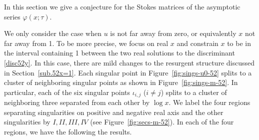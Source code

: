 \documentclass[12pt,reqno]{amsart}
\theoremstyle{definition}
\begin{document}
In this section we give a conjecture for the Stokes matrices of
the asymptotic series $\varphi(x;\tau)$.

We only consider the case when $u$ is not far away from zero, or
equivalently $x$ not far away from 1.  To be more precise, we focus on
real $x$ and constrain $x$ to be in the interval containing 1 between
the two real solutions to the discriminant \eqref{disc52y}.  In this
case, there are mild changes to the resurgent structure discussed in
Section~\ref{sub.52x=1}.  Each singular point in
Figure~\ref{fig:sings-u0-52} splits to a cluster of neighboring
singular points as shown in Figure~\ref{fig:sings-m-52}.  In
particular, each of the six singular points $\iota_{i,j}$ ($i\neq j$)
splits to a cluster of neighboring three separated from each other by
$\log x$.  We label the four regions separating singularities on
positive and negative real axis and the other singularities by
$I,II,III,IV$ (see Figure~\ref{fig:secs-m-52}).  In each of the four
regions, we have the following the results.
\end{document}
